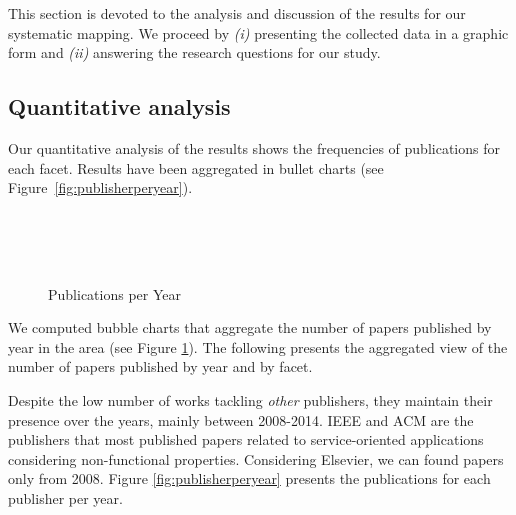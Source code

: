 
This section is devoted to the analysis and discussion of the results for our systematic mapping.
We proceed by \textit{(i)} presenting the collected data in a graphic form and \textit{(ii)} answering the research questions for our study.

\subsection{Quantitative analysis}
Our quantitative analysis of the results shows the  
frequencies of publications for each facet. Results have been aggregated in bullet charts (see  Figure~\ref{fig:publisherperyear}).
\begin{figure}
  \centering
  ~ %
  \\
  ~
  \\
  ~ %

  \caption{Publications per Year}
  \label{fig:publicationsperyear}
\end{figure}

We computed bubble charts that aggregate the number of papers published by year in the area (see
Figure \ref{fig:publicationsperyear}).  The following  presents the aggregated view of the number of papers published by year and by facet.

Despite  the low number of works tackling \textit{other} publishers, they
maintain their presence over the years,  mainly between 2008-2014. IEEE and ACM are
the publishers that most published papers related to service-oriented
applications considering non-functional properties. Considering Elsevier, we can
found papers only from 2008. Figure \ref{fig:publisherperyear} presents the
publications for each publisher per year.    

